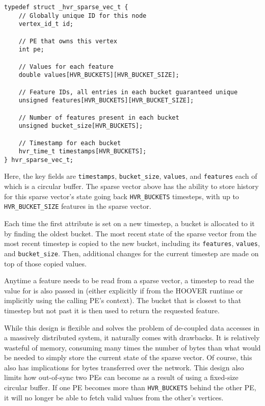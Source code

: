 \begin{verbatim}
typedef struct _hvr_sparse_vec_t {
    // Globally unique ID for this node
    vertex_id_t id;

    // PE that owns this vertex
    int pe;

    // Values for each feature
    double values[HVR_BUCKETS][HVR_BUCKET_SIZE];

    // Feature IDs, all entries in each bucket guaranteed unique
    unsigned features[HVR_BUCKETS][HVR_BUCKET_SIZE];

    // Number of features present in each bucket
    unsigned bucket_size[HVR_BUCKETS];

    // Timestamp for each bucket
    hvr_time_t timestamps[HVR_BUCKETS];
} hvr_sparse_vec_t;
\end{verbatim}

Here, the key fields are \texttt{timestamps}, \texttt{bucket\_size},
\texttt{values}, and \texttt{features} each of which is a circular buffer. The
sparse vector above has the ability to store history for this sparse vector's
state going back \texttt{HVR\_BUCKETS} timesteps, with up to
\texttt{HVR\_BUCKET\_SIZE} features in the sparse vector.

Each time the first attribute is set on a new timestep, a bucket is allocated to
it by finding the oldest bucket. The most recent state of the sparse vector from
the most recent timestep is copied to the new bucket, including its
\texttt{features}, \texttt{values}, and \texttt{bucket\_size}. Then, additional
changes for the current timestep are made on top of those copied values.

Anytime a feature needs to be read from a sparse vector, a timestep to read the
value for is also passed in (either explicitly if from the HOOVER runtime or
implicitly using the calling PE's context). The bucket that is closest to that
timestep but not past it is then used to return the requested feature.

While this design is flexible and solves the problem of de-coupled data accesses
in a massively distributed system, it naturally comes with drawbacks. It is
relatively wasteful of memory, consuming many times the number of bytes than
what would be needed to simply store the current state of the sparse vector. Of
course, this also has implications for bytes transferred over the network. This
design also limits how out-of-sync two PEs can become as a result of using a
fixed-size circular buffer. If one PE becomes more than \texttt{HVR\_BUCKETS}
behind the other PE, it will no longer be able to fetch valid values from the
other's vertices.

